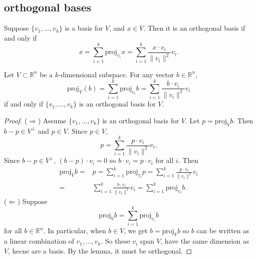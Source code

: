 \documentclass[12pt]{article}
\begin{document}

\subsection{orthogonal bases} %

\begin{lemma}
	Suppose $\{v_1,\dots,v_k\}$ is a basis for $V$, and $x\in V$. Then it is an orthogonal basis if and only if  
	\begin{equation*}
		x = \sum_{i=1}^k \text{proj}_{v_i}x = \sum_{i=1}^k \frac{x\cdot v_i}{\|v_i\|^2}v_i.
	\end{equation*}
\end{lemma}

\begin{proposition}
	Let $V\subset\mathbb{R}^n$ be a $k$-dimensional subspace. For any vector $b\in\mathbb{R}^n$, 
	\begin{equation*}
		\text{proj}_V(b) = \sum_{i=1}^k \text{proj}_{v_i}b = \sum_{i=1}^k \frac{b\cdot v_i}{\|v_i\|^2}v_i \tag{$\ast\ast$}
	\end{equation*}
	if and only if $\{v_1,\dots,v_k\}$ is an orthogonal basis for $V$.
\end{proposition}
\begin{proof} 
	($\Rightarrow$) Assume $\{v_1,\dots,v_k\}$ is an orthogonal basis for $V$. Let $p=\text{proj}_Vb$. Then $b-p\in V^\perp$ and $p\in V$. Since $p\in V$, 
	\begin{equation*}
		p = \sum_{i=1}^k \frac{p\cdot v_i}{\|v_i\|^2}v_i.
	\end{equation*}
	Since $b-p\in V^\perp$, $(b-p)\cdot v_i=0$ so $b\cdot v_i = p\cdot v_i$ for all $i$. Then 
	\begin{align*}
		\text{proj}_Vb 
		=& p = \sum_{i=1}^k \text{proj}_{v_i}p = \sum_{i=1}^k \frac{p\cdot v_i}{\|v_i\|^2}v_i \\
		=& \sum_{i=1}^k \frac{b\cdot v_i}{\|v_i\|^2}v_i = \sum_{i=1}^k \text{proj}_{v_i}b.
	\end{align*}
	($\Leftarrow$) Suppose 
	\begin{equation*}
		\text{proj}_Vb = \sum_{i=1}^k \text{proj}_{v_i}b
	\end{equation*}
	for all $b\in\mathbb{R}^n$. In particular, when $b\in V$, we get $b=\text{proj}_Vb$ so $b$ can be written as a linear combination of $v_1,\dots,v_k$. So these $v_i$ span $V$, have the same dimension as $V$, hecne are a basis. By the lemma, it must be orthogonal.
\end{proof}	
\end{document}
